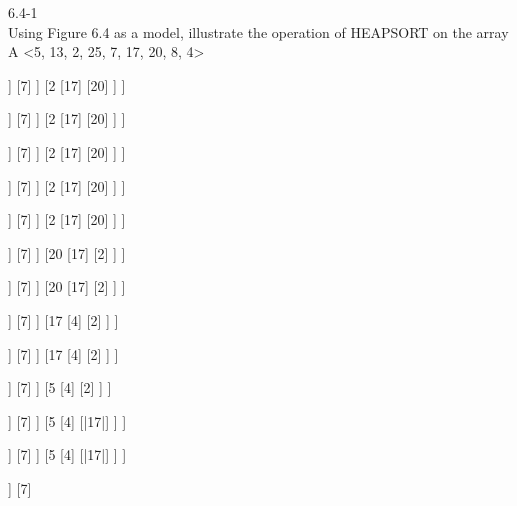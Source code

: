 \documentclass[12pt,largemargins]{homework}
\begin{document}
6.4-1\\
Using Figure 6.4 as a model, illustrate the operation of HEAPSORT on the array
A <5, 13, 2, 25, 7, 17, 20, 8, 4>\\
\begin{center}
\begin{forest}
	[5
		[13
			[25
				[8]
				[4]
			]
			[7]
		]
		[2
			[17]
			[20]
		]
	]
\end{forest}
\begin{forest}
	[13
		[5
			[25
				[8]
				[4]
			]
			[7]
		]
		[2
			[17]
			[20]
		]
	]
\end{forest}
\begin{forest}
	[13
		[25
			[5
				[8]
				[4]
			]
			[7]
		]
		[2
			[17]
			[20]
		]
	]
\end{forest}
\begin{forest}
	[25
		[13
			[5
				[8]
				[4]
			]
			[7]
		]
		[2
			[17]
			[20]
		]
	]
\end{forest}
\begin{forest}
	[25
		[13
			[8
				[5]
				[4]
			]
			[7]
		]
		[2
			[17]
			[20]
		]
	]
\end{forest}
\begin{forest}
	[25
		[13
			[8
				[5]
				[4]
			]
			[7]
		]
		[20
			[17]
			[2]
		]
	]
\end{forest}
\begin{forest}
	[4
		[13
			[8
				[5]
				[|25|]
			]
			[7]
		]
		[20
			[17]
			[2]
		]
	]
\end{forest}
\begin{forest}
	[20
		[13
			[8
				[5]
				[|25|]
			]
			[7]
		]
		[17
			[4]
			[2]
		]
	]
\end{forest}
\begin{forest}
	[5
		[13
			[8
				[|20|]
				[|25|]
			]
			[7]
		]
		[17
			[4]
			[2]
		]
	]
\end{forest}
\begin{forest}
	[17
		[13
			[8
				[|20|]
				[|25|]
			]
			[7]
		]
		[5
			[4]
			[2]
		]
	]
\end{forest}
\begin{forest}
	[2
		[13
			[8
				[|20|]
				[|25|]
			]
			[7]
		]
		[5
			[4]
			[|17|]
		]
	]
\end{forest}
\begin{forest}
	[13
		[8
			[2
				[|20|]
				[|25|]
			]
			[7]
		]
		[5
			[4]
			[|17|]
		]
	]
\end{forest}
\begin{forest}
	[4
		[8
			[2
				[|20|]
				[|25|]
			]
			[7]

\end{forest}
\end{center}
\end{document}
